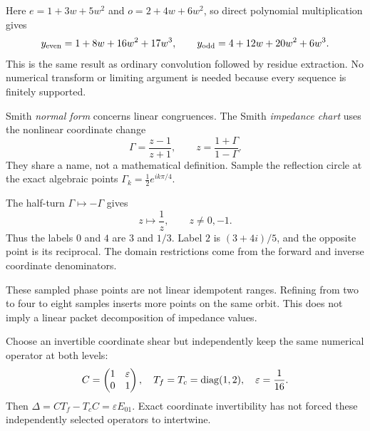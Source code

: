 Here $e=1+3w+5w^2$ and $o=2+4w+6w^2$, so direct polynomial multiplication gives
\[
y_{\rm even}=1+8w+16w^2+17w^3,
\qquad
y_{\rm odd}=4+12w+20w^2+6w^3.
\]
This is the same result as ordinary convolution followed by residue extraction. No numerical transform or limiting argument is needed because every sequence is finitely supported.


Smith \emph{normal form} concerns linear congruences. The Smith \emph{impedance chart} uses the nonlinear coordinate change
\[
\Gamma=\frac{z-1}{z+1},\qquad z=\frac{1+\Gamma}{1-\Gamma}.
\]
They share a name, not a mathematical definition. Sample the reflection circle at the exact algebraic points $\Gamma_k=\tfrac12 e^{ik\pi/4}$.


The half-turn $\Gamma\mapsto-\Gamma$ gives
\[
z\longmapsto\frac1z,\qquad z\ne0,-1.
\]
Thus the labels $0$ and $4$ are $3$ and $1/3$. Label $2$ is $(3+4i)/5$, and the opposite point is its reciprocal. The domain restrictions come from the forward and inverse coordinate denominators.

These sampled phase points are not linear idempotent ranges. Refining from two to four to eight samples inserts more points on the same orbit. This does not imply a linear packet decomposition of impedance values.


Choose an invertible coordinate shear but independently keep the same numerical operator at both levels:
\[
C=\begin{pmatrix}1&\varepsilon\\0&1\end{pmatrix},\quad
T_f=T_c=\operatorname{diag}(1,2),\quad \varepsilon=\frac1{16}.
\]
Then $\Delta=CT_f-T_cC=\varepsilon E_{01}$. Exact coordinate invertibility has not forced these independently selected operators to intertwine.

